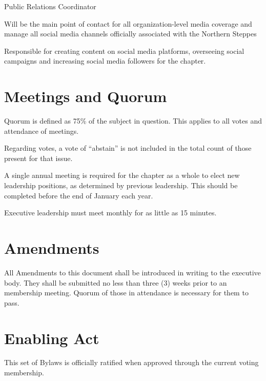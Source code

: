 \documentclass[12pt]{article}
\begin{document}
\begin{level}
\begin{level}
\begin{level}
        \end{level}
        \item Public Relations Coordinator
        \begin{level} 
            \item Will be the main point of contact for all organization-level media coverage and manage all social media channels officially associated with the Northern Steppes
            \item Responsible for creating content on social media platforms, overseeing social campaigns and increasing social media followers for the chapter.
        \end{level}
    \end{level}

\end{level}

\section{Meetings and Quorum}
\begin{level} 
    \item Quorum is defined as 75\% of the subject in question. This applies to all votes and attendance of meetings.
    \begin{level} 
        \item Regarding votes, a vote of “abstain” is not included in the total count of those present for that issue.
    \end{level}
    \item A single annual meeting is required for the chapter as a whole to elect new leadership positions, as determined by previous leadership. This should be completed before the end of January each year.
    \item Executive leadership must meet monthly for as little as 15 minutes.
\end{level}

\section{Amendments}
\begin{level} 
    \item All Amendments to this document shall be introduced in writing to the executive body. They shall be submitted no less than three (3) weeks prior to an membership meeting. Quorum of those in attendance is necessary for them to pass.
\end{level}

\section{Enabling Act}
\begin{level} 
    \item This set of Bylaws is officially ratified when approved through the current voting membership.
\end{level}
\end{document}
